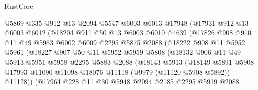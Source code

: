 \begin{lexlean}{RustCore}
\begin{coremodule}
                    @5869
                    @335
                    @912
                    @13
                    @2094
                    @5547
                    @6003
                    @6013
                    @17948
                    (@17931
                      @912
                      @13
                      @6003
                      @6012
                      (@18204
                        @911
                        @50
                        @13
                        @6003
                        @6010
                        @4639
                        (@17826
                          @908
                          @910
                          @11
                          @49
                          @5963
                          @6002
                          @6009
                          @2295
                          @5875
                          @2088
                          (@18222
                            @908
                            @11
                            @5952
                            @5961
                            (@18227
                              @907
                              @50
                              @11
                              @5952
                              @5959
                              @5808
                              (@18132
                                @906
                                @11
                                @49
                                @5913
                                @5951
                                @5958
                                @2295
                                @5883
                                @2088
                                (@18143
                                  @5913
                                  (@18149
                                    @5891
                                    @5908
                                    @17993
                                    @11090
                                    @11098
                                    @18076
                                    @11118
                                    (@9979 (@11120 @5908 @5892))
                                    @11128))
                                (@17964
                                  @228
                                  @11
                                  @30
                                  @5948
                                  @2094
                                  @2185
                                  @2295
                                  @5919
                                  @2088

\end{coremodule}
\end{lexlean}
